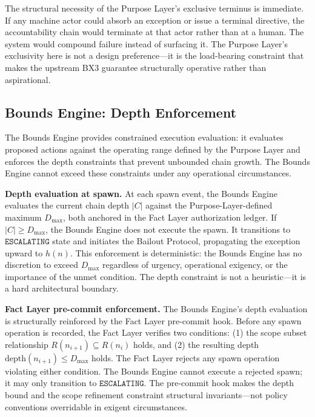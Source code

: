 The structural necessity of the Purpose Layer's exclusive terminus is immediate. If any machine actor could absorb an exception or issue a terminal directive, the accountability chain would terminate at that actor rather than at a human. The system would compound failure instead of surfacing it. The Purpose Layer's exclusivity here is not a design preference---it is the load-bearing constraint that makes the upstream BX3 guarantee structurally operative rather than aspirational.

\subsection{Bounds Engine: Depth Enforcement}
\label{sec:rs-bounds-depth}

The Bounds Engine provides constrained execution evaluation: it evaluates proposed actions against the operating range defined by the Purpose Layer and enforces the depth constraints that prevent unbounded chain growth. The Bounds Engine cannot exceed these constraints under any operational circumstances.

\medskip
\noindent\textbf{Depth evaluation at spawn.} At each spawn event, the Bounds Engine evaluates the current chain depth $|C|$ against the Purpose-Layer-defined maximum $D_{\mathrm{max}}$, both anchored in the Fact Layer authorization ledger. If $|C| \geq D_{\mathrm{max}}$, the Bounds Engine does not execute the spawn. It transitions to $\texttt{ESCALATING}$ state and initiates the Bailout Protocol, propagating the exception upward to $h(n)$. This enforcement is deterministic: the Bounds Engine has no discretion to exceed $D_{\mathrm{max}}$ regardless of urgency, operational exigency, or the importance of the unmet condition. The depth constraint is not a heuristic---it is a hard architectural boundary.

\medskip
\noindent\textbf{Fact Layer pre-commit enforcement.} The Bounds Engine's depth evaluation is structurally reinforced by the Fact Layer pre-commit hook. Before any spawn operation is recorded, the Fact Layer verifies two conditions: (1) the scope subset relationship $R(n_{i+1}) \subseteq R(n_i)$ holds, and (2) the resulting depth $\mathrm{depth}(n_{i+1}) \leq D_{\mathrm{max}}$ holds. The Fact Layer rejects any spawn operation violating either condition. The Bounds Engine cannot execute a rejected spawn; it may only transition to $\texttt{ESCALATING}$. The pre-commit hook makes the depth bound and the scope refinement constraint structural invariants---not policy conventions overridable in exigent circumstances.

